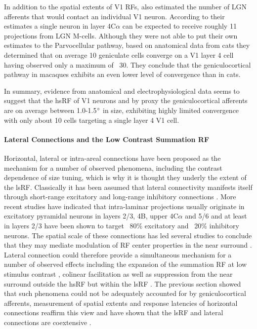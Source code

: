 In addition to the spatial extents of V1 RFs, \cite{Angelucci2006a}
also estimated the number of LGN afferents that would contact an
individual V1 neuron. According to their estimates a single neuron in
layer 4C$\alpha$ can be expected to receive roughly 11 projections
from LGN M-cells. Although they were not able to put their own
estimates to the Parvocellular pathway, based on anatomical data from
cats they determined that on average 10 geniculate cells converge on a
V1 layer 4 cell having observed only a maximum of ~30. They conclude
that the geniculocortical pathway in macaques exhibits an even lower
level of convergence than in cats.

In summary, evidence from anatomical and electrophysiological data
seems to suggest that the hsRF of V1 neurons and by proxy the
geniculocortical afferents are on average between 1.0-1.5$\degree$ in
size, exhibiting highly limited convergence with only about 10 cells
targeting a single layer 4 V1 cell.

\paragraph{Lateral Connections and the Low Contrast Summation RF}

Horizontal, lateral or intra-areal connections have been proposed as
the mechanism for a number of observed phenomena, including the
contrast dependence of size tuning, which is why it is thought they
underly the extent of the lsRF. Classically it has been assumed that
lateral connectivity manifests itself through short-range excitatory
and long-range inhibitory connections
\citep{VonderMalsburg1973,Obermayer1990b}. More recent studies have
indicated that intra-laminar projections usually originate in
excitatory pyramidal neurons in layers 2/3, 4B, upper 4C$\alpha$ and
5/6 and at least in layers 2/3 have been shown to target ~80\%
excitatory and ~20\% inhibitory neurons. The spatial scale of these
connections has led several studies to conclude that they may mediate
modulation of RF center properties in the near surround
\citep{Angelucci2002}. Lateral connection could therefore provide a
simultaneous mechanism for a number of observed effects including the
expansion of the summation RF at low stimulus contrast
\citep{Sceniak1999}, colinear facilitation \citep{Mizobe2001} as well
as suppression from the near surround outside the hsRF but within the
lsRF \citep{Sceniak2001,Levitt2002}. The previous section showed that
such phenomena could not be adequately accounted for by
geniculocortical afferents, measurement of spatial extents and
response latencies of horizontal connections reaffirm this view and
have shown that the lsRF and lateral connections are coextensive
\citep{Angelucci2002}.

